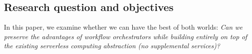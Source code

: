 

\subsection{Research question and objectives}
In this paper, we examine whether we can have the best of both worlds:
\emph{Can we preserve the advantages of workflow orchestrators
while building entirely on top of the existing serverless computing
abstraction (no supplemental services)?}

